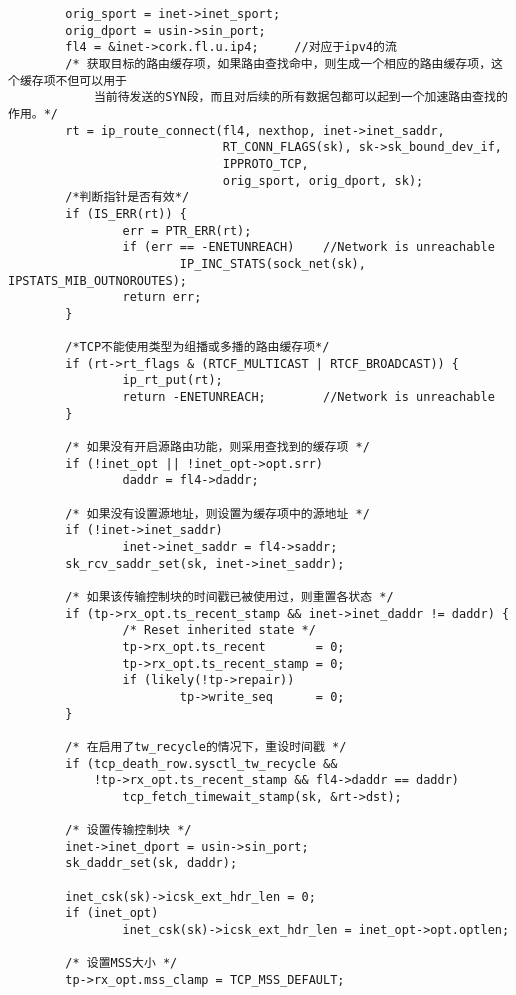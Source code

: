\begin{verbatim}
        orig_sport = inet->inet_sport;
        orig_dport = usin->sin_port;
        fl4 = &inet->cork.fl.u.ip4;		//对应于ipv4的流
        /* 获取目标的路由缓存项，如果路由查找命中，则生成一个相应的路由缓存项，这个缓存项不但可以用于
			当前待发送的SYN段，而且对后续的所有数据包都可以起到一个加速路由查找的作用。*/
        rt = ip_route_connect(fl4, nexthop, inet->inet_saddr,
                              RT_CONN_FLAGS(sk), sk->sk_bound_dev_if,
                              IPPROTO_TCP,
                              orig_sport, orig_dport, sk);
		/*判断指针是否有效*/        
		if (IS_ERR(rt)) {
                err = PTR_ERR(rt);
                if (err == -ENETUNREACH)	//Network is unreachable
                        IP_INC_STATS(sock_net(sk), IPSTATS_MIB_OUTNOROUTES);
                return err;
        }

		/*TCP不能使用类型为组播或多播的路由缓存项*/
        if (rt->rt_flags & (RTCF_MULTICAST | RTCF_BROADCAST)) {
                ip_rt_put(rt);
                return -ENETUNREACH;		//Network is unreachable
        }

        /* 如果没有开启源路由功能，则采用查找到的缓存项 */
        if (!inet_opt || !inet_opt->opt.srr)
                daddr = fl4->daddr;

        /* 如果没有设置源地址，则设置为缓存项中的源地址 */
        if (!inet->inet_saddr)
                inet->inet_saddr = fl4->saddr;
        sk_rcv_saddr_set(sk, inet->inet_saddr);

        /* 如果该传输控制块的时间戳已被使用过，则重置各状态 */
        if (tp->rx_opt.ts_recent_stamp && inet->inet_daddr != daddr) {
                /* Reset inherited state */
                tp->rx_opt.ts_recent       = 0;
                tp->rx_opt.ts_recent_stamp = 0;
                if (likely(!tp->repair))
                        tp->write_seq      = 0;
        }

        /* 在启用了tw_recycle的情况下，重设时间戳 */
        if (tcp_death_row.sysctl_tw_recycle &&
            !tp->rx_opt.ts_recent_stamp && fl4->daddr == daddr)
                tcp_fetch_timewait_stamp(sk, &rt->dst);

        /* 设置传输控制块 */
        inet->inet_dport = usin->sin_port;
        sk_daddr_set(sk, daddr);

        inet_csk(sk)->icsk_ext_hdr_len = 0;
        if (inet_opt)
                inet_csk(sk)->icsk_ext_hdr_len = inet_opt->opt.optlen;

        /* 设置MSS大小 */
        tp->rx_opt.mss_clamp = TCP_MSS_DEFAULT;


\end{verbatim}
